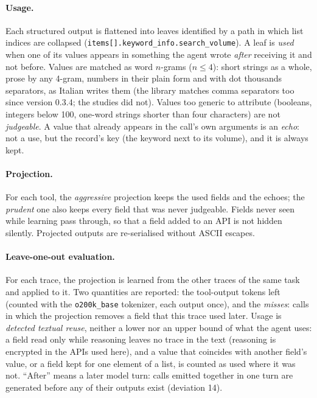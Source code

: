 \paragraph{Usage.} Each structured output is flattened into leaves identified by a path in which list indices are
collapsed (\texttt{items[].keyword\_info.search\_volume}). A leaf is \emph{used} when one of its values appears in
something the agent wrote \emph{after} receiving it and not before. Values are matched as word $n$-grams
($n \le 4$): short strings as a whole, prose by any 4-gram, numbers in their plain form and with dot thousands separators, as Italian writes them (the library
matches comma separators too since version 0.3.4; the studies did not). Values too
generic to attribute (booleans, integers below 100, one-word strings shorter than four characters) are not
\emph{judgeable}. A value that already appears in the call's own arguments is an \emph{echo}: not a use, but the
record's key (the keyword next to its volume), and it is always kept.

\paragraph{Projection.} For each tool, the \emph{aggressive} projection keeps the used fields and the echoes; the
\emph{prudent} one also keeps every field that was never judgeable. Fields never seen while learning pass through,
so that a field added to an API is not hidden silently. Projected outputs are re-serialised without ASCII escapes.

\paragraph{Leave-one-out evaluation.} For each trace, the projection is learned from the other traces of the same
task and applied to it. Two quantities are reported: the tool-output tokens left (counted with the
\texttt{o200k\_base} tokenizer, each output once), and the \emph{misses}: calls in which the projection removes a
field that this trace used later. Usage is \emph{detected textual reuse}, neither a lower nor an upper bound of what
the agent uses: a field read only while reasoning leaves no trace in the text (reasoning is encrypted in the APIs
used here), and a value that coincides with another field's value, or a field kept for one element of a list, is
counted as used where it was not. ``After'' means a later model turn: calls emitted together in one turn are
generated before any of their outputs exist (deviation 14).

